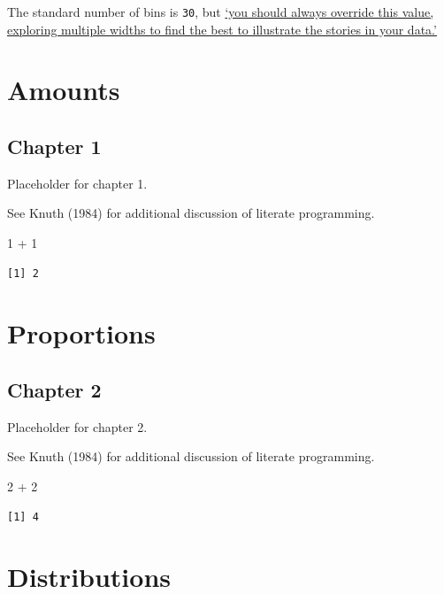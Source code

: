 \documentclass[
  letterpaper,
  DIV=11,
  numbers=noendperiod,
  oneside]{scrreprt}
\newenvironment{Shaded}{\begin{snugshade}}{\end{snugshade}}
\newcommand{\DecValTok}[1]{\textcolor[rgb]{0.68,0.00,0.00}{#1}}
\newcommand{\SpecialCharTok}[1]{\textcolor[rgb]{0.37,0.37,0.37}{#1}}
\begin{document}
The standard number of bins is \texttt{30}, but
\href{https://ggplot2.tidyverse.org/reference/geom_histogram.html}{`you
should always override this value, exploring multiple widths to find the
best to illustrate the stories in your data.'}

\part{Amounts}

\hypertarget{chapter-1}{%
\chapter{Chapter 1}\label{chapter-1}}

Placeholder for chapter 1.

See Knuth (1984) for additional discussion of literate programming.

\begin{Shaded}
\begin{Highlighting}[]
\DecValTok{1} \SpecialCharTok{+} \DecValTok{1}
\end{Highlighting}
\end{Shaded}

\begin{verbatim}
[1] 2
\end{verbatim}

\part{Proportions}

\hypertarget{chapter-2}{%
\chapter{Chapter 2}\label{chapter-2}}

Placeholder for chapter 2.

See Knuth (1984) for additional discussion of literate programming.

\begin{Shaded}
\begin{Highlighting}[]
\DecValTok{2} \SpecialCharTok{+} \DecValTok{2}
\end{Highlighting}
\end{Shaded}

\begin{verbatim}
[1] 4
\end{verbatim}

\part{Distributions}
\end{document}
